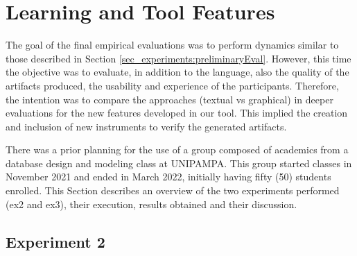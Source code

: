 \section{Learning and Tool Features}
\label{sec_experiments:finalEval}

The goal of the final empirical evaluations was to perform dynamics similar to those described in Section \ref{sec_experiments:preliminaryEval}.
However, this time the objective was to evaluate, in addition to the language, also the quality of the artifacts produced, the usability and experience of the participants.
Therefore, the intention was to compare the approaches (textual vs graphical) in deeper evaluations for the new features developed in our tool.
This implied the creation and inclusion of new instruments to verify the generated artifacts.

There was a prior planning for the use of a group composed of academics from a database design and modeling class at UNIPAMPA.
This group started classes in November 2021 and ended in March 2022, initially having fifty (50) students enrolled.
This Section describes an overview of the two experiments performed (\ac{ex2} and \ac{ex3}), their execution, results obtained and their discussion.


\subsection{Experiment 2}
\label{ssec_experiments:Experiment2}

